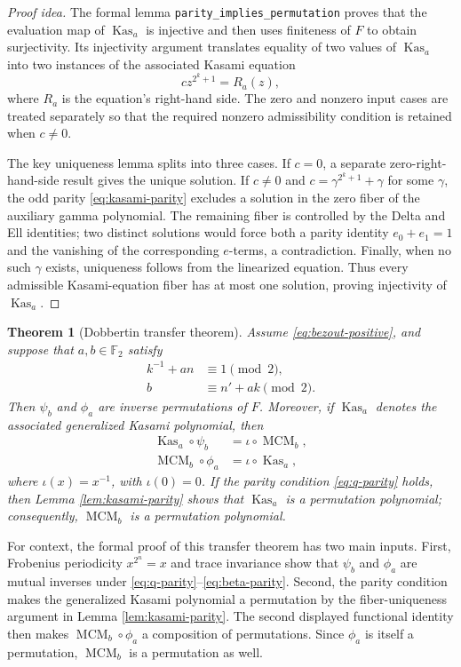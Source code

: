 \documentclass[11pt]{article}
\newtheorem{theorem}{Theorem}
\newcommand{\F}{\mathbb{F}}
\newcommand{\MCM}{\operatorname{MCM}}
\newcommand{\Kas}{\operatorname{Kas}}
\begin{document}
\begin{proof}[Proof idea]
The formal lemma \verb|parity_implies_permutation| proves that the evaluation
map of $\Kas_a$ is injective and then uses finiteness of $F$ to obtain
surjectivity.  Its injectivity argument translates equality of two values of
$\Kas_a$ into two instances of the associated Kasami equation
\[
  c z^{2^k+1}=R_a(z),
\]
where $R_a$ is the equation's right-hand side.  The zero and nonzero input
cases are treated separately so that the required nonzero admissibility
condition is retained when $c\ne0$.

The key uniqueness lemma splits into three cases.  If $c=0$, a separate
zero-right-hand-side result gives the unique solution.  If $c\ne0$ and
$c=\gamma^{2^k+1}+\gamma$ for some $\gamma$, the odd parity
\eqref{eq:kasami-parity} excludes a solution in the zero fiber of the
auxiliary gamma polynomial.  The remaining fiber is controlled by the
Delta and Ell identities; two distinct solutions would force both a parity
identity $e_0+e_1=1$ and the vanishing of the corresponding $e$-terms, a
contradiction.  Finally, when no such $\gamma$ exists, uniqueness follows
from the linearized equation.  Thus every admissible Kasami-equation fiber
has at most one solution, proving injectivity of $\Kas_a$.
\end{proof}

\begin{theorem}[Dobbertin transfer theorem]
\label{thm:transfer}
Assume \eqref{eq:bezout-positive}, and suppose that $a,b\in\F_2$ satisfy
\begin{align}
\label{eq:q-parity}
  k^{-1}+an &\equiv 1 \pmod 2,\\
\label{eq:beta-parity}
  b &\equiv n'+ak \pmod 2.
\end{align}
Then $\psi_b$ and $\phi_a$ are inverse permutations of $F$.  Moreover, if
$\Kas_a$ denotes the associated generalized Kasami polynomial, then
\begin{align*}
  \Kas_a\circ\psi_b &= \iota\circ\MCM_b,\\
  \MCM_b\circ\phi_a &= \iota\circ\Kas_a,
\end{align*}
where $\iota(x)=x^{-1}$, with $\iota(0)=0$.  If the parity condition
\eqref{eq:q-parity} holds, then Lemma \ref{lem:kasami-parity} shows that
$\Kas_a$ is a permutation polynomial;
consequently, $\MCM_b$ is a permutation polynomial.
\end{theorem}

For context, the formal proof of this transfer theorem has two main inputs.
First, Frobenius periodicity $x^{2^n}=x$ and trace invariance show that
$\psi_b$ and $\phi_a$ are mutual inverses under
\eqref{eq:q-parity}--\eqref{eq:beta-parity}.  Second, the parity condition
makes the generalized Kasami polynomial a permutation by the fiber-uniqueness
argument in Lemma \ref{lem:kasami-parity}.  The second displayed functional
identity then makes $\MCM_b\circ\phi_a$ a composition of permutations.
Since $\phi_a$ is itself a permutation, $\MCM_b$ is a permutation as well.
\end{document}
